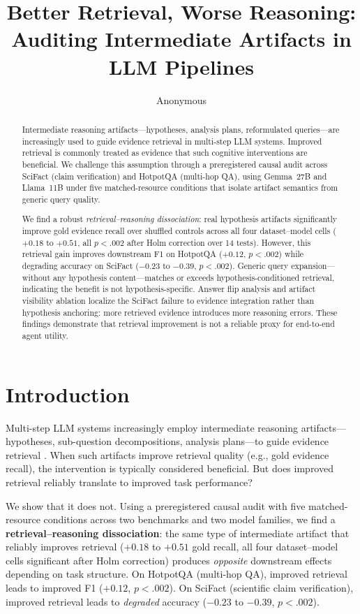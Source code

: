 \documentclass{article}
\title{Better Retrieval, Worse Reasoning:\\Auditing Intermediate Artifacts in LLM Pipelines}
\author{Anonymous}
\date{}
\begin{document}
\maketitle

\begin{abstract}
Intermediate reasoning artifacts---hypotheses, analysis plans, reformulated queries---are increasingly used to guide evidence retrieval in multi-step LLM systems. Improved retrieval is commonly treated as evidence that such cognitive interventions are beneficial. We challenge this assumption through a preregistered causal audit across SciFact (claim verification) and HotpotQA (multi-hop QA), using Gemma~27B and Llama~11B under five matched-resource conditions that isolate artifact semantics from generic query quality.

We find a robust \emph{retrieval--reasoning dissociation}: real hypothesis artifacts significantly improve gold evidence recall over shuffled controls across all four dataset--model cells ($+0.18$ to $+0.51$, all $p < .002$ after Holm correction over 14 tests). However, this retrieval gain improves downstream F1 on HotpotQA ($+0.12$, $p < .002$) while degrading accuracy on SciFact ($-0.23$ to $-0.39$, $p < .002$). Generic query expansion---without any hypothesis content---matches or exceeds hypothesis-conditioned retrieval, indicating the benefit is not hypothesis-specific. Answer flip analysis and artifact visibility ablation localize the SciFact failure to evidence integration rather than hypothesis anchoring: more retrieved evidence introduces more reasoning errors. These findings demonstrate that retrieval improvement is not a reliable proxy for end-to-end agent utility.
\end{abstract}

\section{Introduction}
\label{sec:intro}

Multi-step LLM systems increasingly employ intermediate reasoning artifacts---hypotheses, sub-question decompositions, analysis plans---to guide evidence retrieval \citep{hyde2023,query2doc2023,selfrag2024}. When such artifacts improve retrieval quality (e.g., gold evidence recall), the intervention is typically considered beneficial. But does improved retrieval reliably translate to improved task performance?

We show that it does not. Using a preregistered causal audit with five matched-resource conditions across two benchmarks and two model families, we find a \textbf{retrieval--reasoning dissociation}: the same type of intermediate artifact that reliably improves retrieval ($+0.18$ to $+0.51$ gold recall, all four dataset--model cells significant after Holm correction) produces \emph{opposite} downstream effects depending on task structure. On HotpotQA (multi-hop QA), improved retrieval leads to improved F1 ($+0.12$, $p < .002$). On SciFact (scientific claim verification), improved retrieval leads to \emph{degraded} accuracy ($-0.23$ to $-0.39$, $p < .002$).
\end{document}
